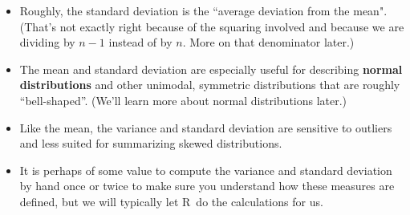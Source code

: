 \documentclass[twoside]{book}\usepackage[]{graphicx}\usepackage[]{xcolor}
\def\R{{\sf R}}
\def\term#1{\textbf{#1}}
\begin{document}
\begin{itemize}
\item
Roughly, the standard deviation is the ``average deviation from the mean".  (That's not
exactly right because of the squaring involved and because we are dividing
by $n-1$ instead of by $n$.  More on that denominator later.)  
\item
The mean and standard deviation are especially useful for describing 
\term{normal distributions} and other unimodal, symmetric distributions that
are roughly ``bell-shaped''.  (We'll learn more about normal distributions later.)
\item
Like the mean, the variance and standard deviation are 
sensitive to outliers and less suited for summarizing skewed distributions.
\item
It is perhaps of some value to compute the variance and standard deviation by hand
once or twice to make sure you understand how these measures are defined, but we will
typically let \R\ do the calculations for us.
\end{itemize}
\end{document}
